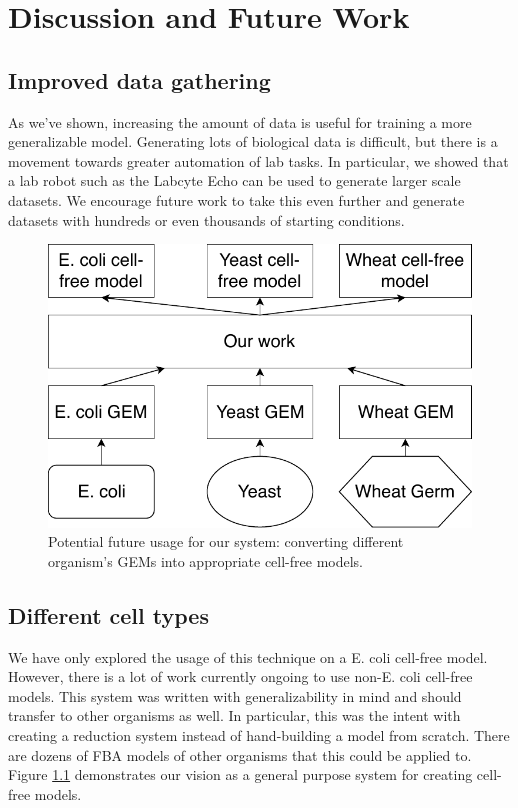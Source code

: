\chapter{Discussion and Future Work} 

\section{Improved data gathering}
As we've shown, increasing the amount of data is useful for training a more generalizable model.
Generating lots of biological data is difficult, but there is a movement towards greater automation of lab tasks.
In particular, we showed that a lab robot such as the Labcyte Echo can be used to generate larger scale datasets.
We encourage future work to take this even further and generate datasets with hundreds or even thousands of starting conditions.

\begin{figure}[t!]
\begin{center}
\includegraphics{figs/Vision.pdf}
\caption{Potential future usage for our system: converting different organism's GEMs into appropriate cell-free models.}
\end{center}
\label{fig:vision}
\end{figure}

\section{Different cell types}
We have only explored the usage of this technique on a E. coli cell-free model.
However, there is a lot of work currently ongoing to use non-E. coli cell-free models.
This system was written with generalizability in mind and should transfer to other organisms as well.
In particular, this was the intent with creating a reduction system instead of hand-building a model from scratch.
There are dozens of FBA models of other organisms that this could be applied to.
Figure \ref{fig:vision} demonstrates our vision as a general purpose system for creating cell-free models.

